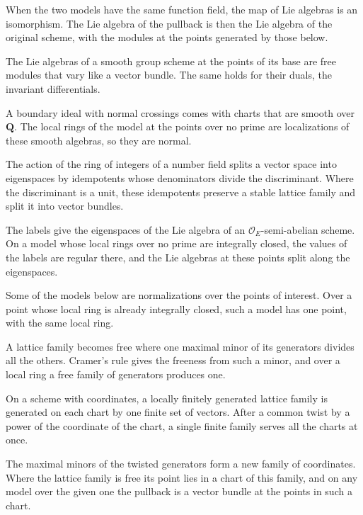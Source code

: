 When the two models have the same function field, the map of Lie algebras is an isomorphism. The Lie algebra of the pullback
is then the Lie algebra of the original scheme, with the modules at the points generated by those below.

The Lie algebras of a smooth group scheme at the points of its base are free modules that vary like a vector bundle. The
same holds for their duals, the invariant differentials.

A boundary ideal with normal crossings comes with charts that are smooth over $\mathbf Q$. The local rings of the model at the
points over no prime are localizations of these smooth algebras, so they are normal.

The action of the ring of integers of a number field splits a vector space into eigenspaces by idempotents whose
denominators divide the discriminant. Where the discriminant is a unit, these idempotents preserve a stable lattice family
and split it into vector bundles.

The labels give the eigenspaces of the Lie algebra of an $\mathcal O_E$-semi-abelian scheme. On a model whose local rings over
no prime are integrally closed, the values of the labels are regular there, and the Lie algebras at these points split
along the eigenspaces.

Some of the models below are normalizations over the points of interest. Over a point whose local ring is already integrally
closed, such a model has one point, with the same local ring.

A lattice family becomes free where one maximal minor of its generators divides all the others. Cramer's rule gives the
freeness from such a minor, and over a local ring a free family of generators produces one.

On a scheme with coordinates, a locally finitely generated lattice family is generated on each chart by one finite set of
vectors. After a common twist by a power of the coordinate of the chart, a single finite family serves all the charts at once.

The maximal minors of the twisted generators form a new family of coordinates. Where the lattice family is free its point lies in
a chart of this family, and on any model over the given one the pullback is a vector bundle at the points in such a chart.


